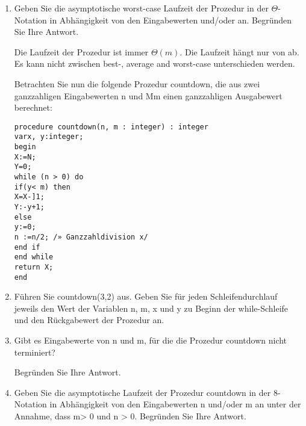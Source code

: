 \documentclass{lehramt-informatik-aufgabe}
\begin{document}
\begin{enumerate}

\item Geben Sie die asymptotische worst-case Laufzeit der Prozedur
 in der $\Theta$-Notation in Abhängigkeit von den
Eingabewerten  und/oder  an. Begründen Sie Ihre Antwort.

\begin{liAntwort}
Die Laufzeit der Prozedur ist immer $\Theta(m)$. Die Laufzeit hängt nur
von  ab. Es kann nicht zwischen best-, average and worst-case
unterschieden werden.
\end{liAntwort}

Betrachten Sie nun die folgende Prozedur countdown, die aus zwei
ganzzahligen Eingabewerten n und Mm einen ganzzahligen Ausgabewert
berechnet:

\begin{verbatim}
procedure countdown(n, m : integer) : integer
varx, y:integer;
begin
X:=N;
Y=0;
while (n > 0) do
if(y< m) then
X=X-]1;
Y:-y+1;
else
y:=0;
n :=n/2; /» Ganzzahldivision x/
end if
end while
return X;
end
\end{verbatim}


\item Führen Sie countdown(3,2) aus. Geben Sie für jeden
Schleifendurchlauf jeweils den Wert der Variablen n, m, x und y zu
Beginn der while-Schleife und den Rückgabewert der Prozedur
an.


\item Gibt es Eingabewerte von n und m, für die die Prozedur countdown
nicht terminiert?

Begründen Sie Ihre Antwort.


\item Geben Sie die asymptotische Laufzeit der Prozedur countdown in der
8-Notation in Abhängigkeit von den Eingabewerten n und/oder m an unter
der Annahme, dass m> 0
und n > 0. Begründen Sie Ihre Antwort.

\end{enumerate}
\end{document}
